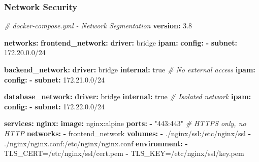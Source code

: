 \documentclass[
]{article}
\newenvironment{Shaded}{\begin{snugshade}}{\end{snugshade}}
\newcommand{\AttributeTok}[1]{\textcolor[rgb]{0.13,0.29,0.53}{#1}}
\newcommand{\CharTok}[1]{\textcolor[rgb]{0.31,0.60,0.02}{#1}}
\newcommand{\CommentTok}[1]{\textcolor[rgb]{0.56,0.35,0.01}{\textit{#1}}}
\newcommand{\FunctionTok}[1]{\textcolor[rgb]{0.13,0.29,0.53}{\textbf{#1}}}
\newcommand{\KeywordTok}[1]{\textcolor[rgb]{0.13,0.29,0.53}{\textbf{#1}}}
\newcommand{\StringTok}[1]{\textcolor[rgb]{0.31,0.60,0.02}{#1}}
\begin{document}
\hypertarget{network-security}{%
\subsubsection{Network Security}\label{network-security}}

\begin{Shaded}
\begin{Highlighting}[]
\CommentTok{\# docker{-}compose.yml {-} Network Segmentation}
\FunctionTok{version}\KeywordTok{:}\AttributeTok{ }\StringTok{\textquotesingle{}3.8\textquotesingle{}}

\FunctionTok{networks}\KeywordTok{:}
\AttributeTok{  }\FunctionTok{frontend\_network}\KeywordTok{:}
\AttributeTok{    }\FunctionTok{driver}\KeywordTok{:}\AttributeTok{ bridge}
\AttributeTok{    }\FunctionTok{ipam}\KeywordTok{:}
\AttributeTok{      }\FunctionTok{config}\KeywordTok{:}
\AttributeTok{        }\KeywordTok{{-}}\AttributeTok{ }\FunctionTok{subnet}\KeywordTok{:}\AttributeTok{ 172.20.0.0/24}

\AttributeTok{  }\FunctionTok{backend\_network}\KeywordTok{:}
\AttributeTok{    }\FunctionTok{driver}\KeywordTok{:}\AttributeTok{ bridge}
\AttributeTok{    }\FunctionTok{internal}\KeywordTok{:}\AttributeTok{ }\CharTok{true}\CommentTok{  \# No external access}
\AttributeTok{    }\FunctionTok{ipam}\KeywordTok{:}
\AttributeTok{      }\FunctionTok{config}\KeywordTok{:}
\AttributeTok{        }\KeywordTok{{-}}\AttributeTok{ }\FunctionTok{subnet}\KeywordTok{:}\AttributeTok{ 172.21.0.0/24}

\AttributeTok{  }\FunctionTok{database\_network}\KeywordTok{:}
\AttributeTok{    }\FunctionTok{driver}\KeywordTok{:}\AttributeTok{ bridge}
\AttributeTok{    }\FunctionTok{internal}\KeywordTok{:}\AttributeTok{ }\CharTok{true}\CommentTok{  \# Isolated network}
\AttributeTok{    }\FunctionTok{ipam}\KeywordTok{:}
\AttributeTok{      }\FunctionTok{config}\KeywordTok{:}
\AttributeTok{        }\KeywordTok{{-}}\AttributeTok{ }\FunctionTok{subnet}\KeywordTok{:}\AttributeTok{ 172.22.0.0/24}

\FunctionTok{services}\KeywordTok{:}
\AttributeTok{  }\FunctionTok{nginx}\KeywordTok{:}
\AttributeTok{    }\FunctionTok{image}\KeywordTok{:}\AttributeTok{ nginx:alpine}
\AttributeTok{    }\FunctionTok{ports}\KeywordTok{:}
\AttributeTok{      }\KeywordTok{{-}}\AttributeTok{ }\StringTok{"443:443"}\CommentTok{  \# HTTPS only, no HTTP}
\AttributeTok{    }\FunctionTok{networks}\KeywordTok{:}
\AttributeTok{      }\KeywordTok{{-}}\AttributeTok{ frontend\_network}
\AttributeTok{    }\FunctionTok{volumes}\KeywordTok{:}
\AttributeTok{      }\KeywordTok{{-}}\AttributeTok{ ./nginx/ssl:/etc/nginx/ssl}
\AttributeTok{      }\KeywordTok{{-}}\AttributeTok{ ./nginx/nginx.conf:/etc/nginx/nginx.conf}
\AttributeTok{    }\FunctionTok{environment}\KeywordTok{:}
\AttributeTok{      }\KeywordTok{{-}}\AttributeTok{ TLS\_CERT=/etc/nginx/ssl/cert.pem}
\AttributeTok{      }\KeywordTok{{-}}\AttributeTok{ TLS\_KEY=/etc/nginx/ssl/key.pem}


\end{Highlighting}
\end{Shaded}
\end{document}

